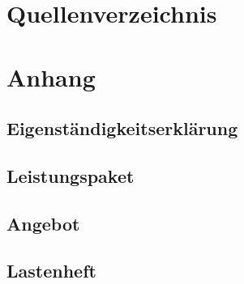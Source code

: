 \appendix

\newpage


\section{Quellenverzeichnis}

\printbibliography

\newpage
\renewcommand{\listfigurename}{Abbildungsverzeichnis}
\listoffigures

\renewcommand{\listfigurename}{Tabellenverzeichnis}
\listoftables

\newpage


\section{Anhang}

\subsection{Eigenständigkeitserklärung}

\subsection{Leistungspaket}\label{subsec:leistungspaket}


\subsection{Angebot}\label{subsec:angebot}


\subsection{Lastenheft}\label{subsec:lastenheft}

